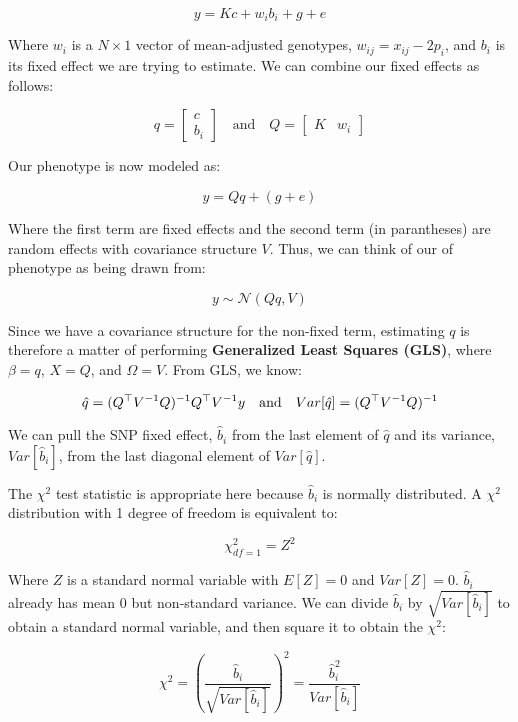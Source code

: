 \documentclass[12pt]{article}
\begin{document}
$$ y = Kc + w_i b_i + g + e $$

Where $w_i$ is a $N \times 1$ vector of mean-adjusted genotypes, $w_{ij} = x_{ij} - 2 p_i$, and $b_i$ is its fixed effect we are trying to estimate. We can combine our fixed effects as follows:

\begin{equation*}
q = \begin{bmatrix} c \\ b_i \end{bmatrix}
\quad\mathrm{and}\quad
Q = \begin{bmatrix} K & w_i \end{bmatrix}
\end{equation*}

Our phenotype is now modeled as:

$$ y = Q q + (g + e) $$

Where the first term are fixed effects and the second term (in parantheses) are random effects with covariance structure $V$. Thus, we can think of our of phenotype as being drawn from:

$$ y \sim \mathcal{N} (Q q, V) $$

Since we have a covariance structure for the non-fixed term, estimating $q$ is therefore a matter of performing \textbf{Generalized Least Squares (GLS)}, where $\beta = q$, $X = Q$, and $\Omega = V$. From GLS, we know:

\begin{equation*}
    \hat{q} = (Q^{\operatorname*{\top}} V^{-1} Q)^{-1} Q^{\operatorname*{\top}} V^{-1} y
    \quad\mathrm{and}\quad
    Var[\hat{q}] = (Q^{\operatorname*{\top}} V^{-1} Q)^{-1}
\end{equation*}

We can pull the SNP fixed effect, $\hat{b}_i$ from the last element of $\hat{q}$ and its variance, $Var[\hat{b}_i]$, from the last diagonal element of $Var[\hat{q}]$.

The $\chi^2$ test statistic is appropriate here because $\hat{b}_i$ is normally distributed.
A $\chi^2$ distribution with 1 degree of freedom is equivalent to:

$$ \chi^2_{df=1} = Z^2$$

Where $Z$ is a standard normal variable with $E[Z]=0$ and $Var[Z]=0$. $\hat{b}_i$ already has mean 0 but non-standard variance.
We can divide $\hat{b}_i$ by $\sqrt{Var[\hat{b}_i]}$ to obtain a standard normal variable, and then square it to obtain the $\chi^2$:

$$ \chi^2 = (\frac{\hat{b}_i}{\sqrt{Var[\hat{b}_i]}})^2 = \frac{\hat{b}_i^2}{Var[\hat{b}_i]} $$
\end{document}
